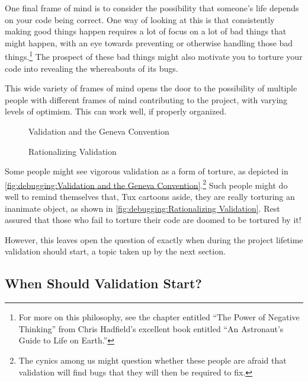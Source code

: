 One final frame of mind is to consider the possibility that someone's
life depends on your code being correct.
One way of looking at this is that consistently making good things happen
requires a lot of focus on a lot of bad things that might happen, with
an eye towards preventing or otherwise handling those bad things.\footnote{
	For more on this philosophy, see the chapter entitled
	``The Power of Negative Thinking''
	from Chris Hadfield's excellent book entitled
	``An Astronaut's Guide to Life on Earth.''}
The prospect of these bad things might also motivate you to torture your
code into revealing the whereabouts of its bugs.

This wide variety of frames of mind opens the door to
the possibility of multiple people with different frames of
mind contributing to the project, with varying levels of optimism.
This can work well, if properly organized.

\begin{figure}
\centering
{}
\caption{Validation and the Geneva Convention}
\end{figure}

\begin{figure}
\centering
{}
\caption{Rationalizing Validation}
\end{figure}

Some people might see vigorous validation as a form of torture, as
depicted in
\cref{fig:debugging:Validation and the Geneva Convention}.\footnote{
	The cynics among us might question whether these people are
	afraid that validation will find bugs that they will then be
	required to fix.}
Such people might do well to remind themselves that, Tux cartoons aside,
they are really torturing an inanimate object, as shown in
\cref{fig:debugging:Rationalizing Validation}.
Rest assured that those who fail to torture their code are doomed to be
tortured by it!

However, this leaves open the question of exactly when during the project
lifetime validation should start, a topic taken up by the next section.

\subsection{When Should Validation Start?}
\label{sec:debugging:When Should Validation Start?}


